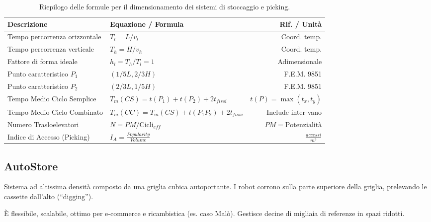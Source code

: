\begin{table}
    \centering
    \begin{tabular}{llr}
        \toprule
        \textbf{Descrizione}          & \textbf{Equazione / Formula}                 & \textbf{Rif. / Unità}      \\
        \midrule
        Tempo percorrenza orizzontale & $T_l = L / v_l$                              & Coord. temp.               \\
        Tempo percorrenza verticale   & $T_h = H / v_h$                              & Coord. temp.               \\
        Fattore di forma ideale       & $h_l = T_h / T_l = 1$                        & Adimensionale              \\
        Punto caratteristico $P_1$    & $(1/5 L, 2/3 H)$                             & F.E.M. 9851                \\
        Punto caratteristico $P_2$    & $(2/3 L, 1/5 H)$                             & F.E.M. 9851                \\
        Tempo Medio Ciclo Semplice    & $T_m(CS) = t(P_1) + t(P_2) + 2t_{fissi}$     & $t(P) = \max(t_x, t_y)$    \\
        Tempo Medio Ciclo Combinato   & $T_m(CC) = T_m(CS) + t(P_1P_2) + 2t_{fissi}$ & Include inter-vano         \\
        Numero Trasloelevatori        & $N = PM / \text{Cicli}_{eff}$                & $PM = \text{Potenzialità}$ \\
        Indice di Accesso (Picking)   & $I_A = \frac{Popularity}{Volume}$            & $\frac{accessi}{m^3}$      \\
        \bottomrule
    \end{tabular}
    \caption{Riepilogo delle formule per il dimensionamento dei sistemi di stoccaggio e picking.}\label{tab:formule_magazzino}
\end{table}


%
\subsection{AutoStore}
Sistema ad altissima densità composto da una griglia cubica autoportante. I robot corrono sulla parte superiore della griglia, prelevando le cassette dall'alto (``digging'').

È flessibile, scalabile, ottimo per e-commerce e ricambistica (es. caso Malò). Gestisce decine di migliaia di referenze in spazi ridotti.

